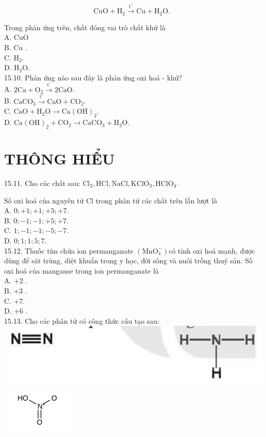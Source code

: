 \documentclass[10pt]{article}
\begin{document}
$$
\mathrm{CuO}+\mathrm{H}_{2} \xrightarrow{\mathrm{t}^{\circ}} \mathrm{Cu}+\mathrm{H}_{2} \mathrm{O} \text {. }
$$

Trong phản ứng trên, chất đóng vai trò chất khử là\\
A. CuO\\
B. Cu .\\
C. $\mathrm{H}_{2}$.\\
D. $\mathrm{H}_{2} \mathrm{O}$.\\
15.10. Phản ứng nào sau đây là phản ứng oxi hoá - khử?\\
A. $2 \mathrm{Ca}+\mathrm{O}_{2} \xrightarrow{\mathrm{t}^{\circ}} 2 \mathrm{CaO}$.\\
B. $\mathrm{CaCO}_{3} \xrightarrow{\mathrm{t}^{\circ}} \mathrm{CaO}+\mathrm{CO}_{2}$.\\
C. $\mathrm{CaO}+\mathrm{H}_{2} \mathrm{O} \longrightarrow \mathrm{Ca}(\mathrm{OH})_{2}$.\\
D. $\mathrm{Ca}(\mathrm{OH})_{2}+\mathrm{CO}_{2} \longrightarrow \mathrm{CaCO}_{3}+\mathrm{H}_{2} \mathrm{O}$.

\section*{THÔNG HIỂU}
15.11. Cho các chất sau: $\mathrm{Cl}_{2}, \mathrm{HCl}, \mathrm{NaCl}, \mathrm{KClO}_{3}, \mathrm{HClO}_{4}$.

Số oxi hoá của nguyên tử Cl trong phân tử các chất trên lần lượt là\\
A. $0 ;+1 ;+1 ;+5 ;+7$.\\
B. $0 ;-1 ;-1 ;+5 ;+7$.\\
C. $1 ;-1 ;-1 ;-5 ;-7$.\\
D. $0 ; 1 ; 1 ; 5 ; 7$.\\
15.12. Thuốc tím chứa ion permanganate $\left(\mathrm{MnO}_{4}^{-}\right)$có tính oxi hoá mạnh, được dùng để sát trùng, diệt khuẩn trong y học, đời sông và nuôi trồng thuỷ sản. Số oxi hoá của manganse trong ion permanganate là\\
A. +2 .\\
B. +3 .\\
C. +7.\\
D. +6 .\\
15.13. Cho các phân tử có công thức cấu tạo sau:\\
\includegraphics[max width=\textwidth, center]{2025_10_23_daab5c8457c85b365b9eg-37}\\
\includegraphics{smile-05a586121601408a2bcf8ebfbfb55f3298ad3186}
\end{document}
